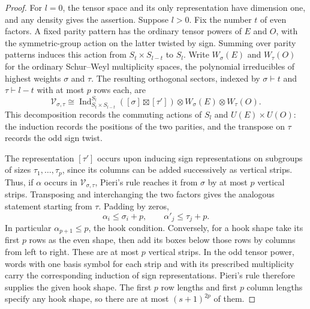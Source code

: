 \begin{proof}
For \(l=0\), the tensor space and its only representation have dimension
one, and any density gives the assertion. Suppose \(l>0\). Fix the number
\(t\) of even factors. A fixed parity pattern has the ordinary tensor
powers of \(E\) and \(O\), with the symmetric-group action on the latter
twisted by sign. Summing over parity patterns induces this action from
\(S_t\times S_{l-t}\) to \(S_l\). Write \(W_\sigma(E)\) and \(W_\tau(O)\)
for the ordinary Schur--Weyl multiplicity spaces, the polynomial
irreducibles of highest weights \(\sigma\) and \(\tau\). The resulting
orthogonal sectors, indexed by \(\sigma\vdash t\) and \(\tau\vdash l-t\)
with at most \(p\) rows each, are
\[
 \mathcal V_{\sigma,\tau}\cong
 \operatorname{Ind}_{S_t\times S_{l-t}}^{S_l}
       ([\sigma]\boxtimes[\tau'])
 \otimes W_\sigma(E)\otimes W_\tau(O).
\]
This decomposition records the commuting actions of \(S_l\) and
\(U(E)\times U(O)\): the induction records the positions of the two
parities, and the transpose on \(\tau\) records the odd sign twist.

The representation \([\tau']\) occurs upon inducing sign representations
on subgroups of sizes \(\tau_1,\ldots,\tau_p\), since its columns can be
added successively as vertical strips. Thus, if \(\alpha\) occurs in
\(\mathcal V_{\sigma,\tau}\), Pieri's rule reaches it from \(\sigma\) by
at most \(p\) vertical strips. Transposing and interchanging the two
factors gives the analogous statement starting from \(\tau\). Padding by
zeros,
\[
 \alpha_i\le\sigma_i+p,\qquad \alpha'_j\le\tau_j+p.
\]
In particular \(\alpha_{p+1}\le p\), the hook condition. Conversely, for
a hook shape take its first \(p\) rows as the even shape, then add its boxes
below those rows by columns from left to right. These are at most \(p\)
vertical strips. In the odd tensor power, words with one basis symbol for
each strip and with its prescribed multiplicity carry the corresponding
induction of sign representations. Pieri's rule therefore supplies the
given hook shape. The first \(p\) row lengths and first \(p\) column
lengths specify any hook shape, so there are at most \((s+1)^{2p}\) of
them.


\end{proof}
